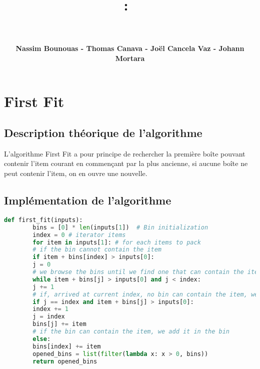 \documentclass{article}
\title{
\vspace{2in}
\textmd{\textbf{\hmwkClass :\ \hmwkTitle}}\\
\vspace{0.2in}\Large{\textit{\ \hmwkDueDate}}
\vspace{3in}
}
\author{\textbf{Nassim Bounouas - Thomas Canava - Joël Cancela Vaz - Johann Mortara}}
\date{} %
\begin{document}
    \maketitle



    \newpage
    \tableofcontents
    \newpage


    \section{First Fit}
    \subsection{Description théorique de l'algorithme}
    L'algorithme First Fit a pour principe de rechercher la première boîte pouvant contenir l'item courant en commençant par la plus ancienne, si aucune boîte ne peut contenir l'item, on en ouvre une nouvelle.

    \subsection{Implémentation de l'algorithme}
    \begin{lstlisting}[language=Python, frame=single]
        def first_fit(inputs):
        bins = [0] * len(inputs[1])  # Bin initialization
        index = 0 # iterator items
        for item in inputs[1]: # for each items to pack
        # if the bin cannot contain the item
        if item + bins[index] > inputs[0]:
        j = 0
        # we browse the bins until we find one that can contain the item
        while item + bins[j] > inputs[0] and j < index:
        j += 1
        # if, arrived at current index, no bin can contain the item, we add one
        if j == index and item + bins[j] > inputs[0]:
        index += 1
        j = index
        bins[j] += item
        # if the bin can contain the item, we add it in the bin
        else:
        bins[index] += item
        opened_bins = list(filter(lambda x: x > 0, bins))
        return opened_bins
    \end{lstlisting}
\end{document}

